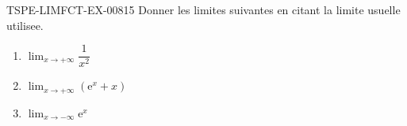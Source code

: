 \begin{exercice}{TSPE-LIMFCT-EX-008}{1}{5}
Donner les limites suivantes en citant la limite usuelle utilisee.
\begin{enumerate}
  \item $\lim_{x \to +\infty} \dfrac{1}{x^2}$
  \item $\lim_{x \to +\infty} (\mathrm{e}^x + x)$
  \item $\lim_{x \to -\infty} \mathrm{e}^x$
\end{enumerate}
\end{exercice}
